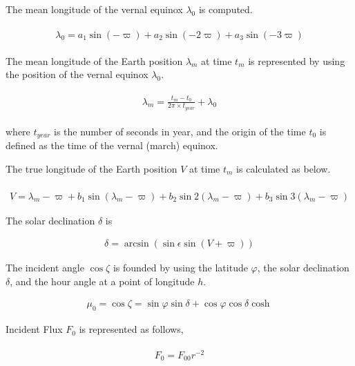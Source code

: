 The mean longitude of the vernal equinox \(\lambda_{0}\) is computed.

\begin{eqnarray}
\begin{array}{c}
\lambda_{0}=a_{1} \sin (-\varpi)+a_{2} \sin (-2 \varpi)+a_{3} \sin (-3 \varpi)
\end{array}
\end{eqnarray}

The mean longitude of the Earth position \(\lambda_{m}\) at time \(t_m\)
is represented by using the position of the vernal equinox
\(\lambda_{0}\).

\begin{eqnarray}
\begin{array}{c}
\lambda_{m}=\frac{t_{m}-t_{0}}{2 \pi \times　t_{year}}+\lambda_{0}
\end{array}
\end{eqnarray}

where \(t_{year}\) is the number of seconds in year, and the origin of
the time \(t_0\) is defined as the time of the vernal (march) equinox.

The true longitude of the Earth position \(V\) at time \(t_m\) is
calculated as below.

\begin{eqnarray}
\\V=\lambda_{m}-\varpi+b_{1} \sin \left(\lambda_{m}-\varpi\right)+b_{2} \sin 2\left(\lambda_{m}-\varpi\right)+b_{3} \sin 3\left(\lambda_{m}-\varpi\right)
\end{eqnarray}

The solar declination \(\delta\) is

\begin{eqnarray}
\delta=\arcsin (\sin \epsilon \sin (V+\varpi))
\end{eqnarray}

The incident angle \(\cos \zeta\) is founded by using the latitude
\(\varphi\), the solar declination \(\delta\), and the hour angle at a
point of longitude \(h\).

\begin{eqnarray}
\mu_{0}=\cos \zeta=\sin \varphi \sin \delta+\cos \varphi \cos \delta \cosh
\end{eqnarray}

Incident Flux \(F_0\) is represented as follows,

\begin{eqnarray}
\begin{array}{c}
F_{0}=F_{00} r^{-2}
\end{array}
\end{eqnarray}

